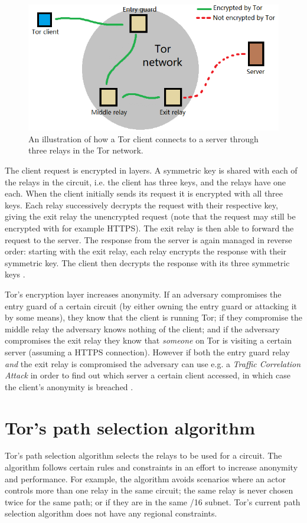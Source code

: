\documentclass{kththesis}
\begin{document}
\begin{figure}[!htb]
    \centering
    \includegraphics[width=350pt]{resources/paint_tor_circuit.png}
    \caption{An illustration of how a Tor client connects to a server through three relays in the Tor network.}
    \label{fig:torCircuit}
\end{figure}

The client request is encrypted in layers. A symmetric key is shared with each of the relays in the circuit, i.e. the client has three keys, and the relays have one each. When the client initially sends its request it is encrypted with all three keys. Each relay successively decrypts the request with their respective key, giving the exit relay the unencrypted request (note that the request may still be encrypted with for example HTTPS). The exit relay is then able to forward the request to the server. The response from the server is again managed in reverse order: starting with the exit relay, each relay encrypts the response with their symmetric key. The client then decrypts the response with its three symmetric keys \parencite{TorOnionRouter}\parencite{UnderstandingTor}.

Tor's encryption layer increases anonymity. If an adversary compromises the entry guard of a certain circuit (by either owning the entry guard or attacking it by some means), they know that the client is running Tor; if they compromise the middle relay the adversary knows nothing of the client; and if the adversary compromises the exit relay they know that \emph{someone} on Tor is visiting a certain server (assuming a HTTPS connection). However if both the entry guard relay \emph{and} the exit relay is compromised the adversary can use e.g. a \emph{Traffic Correlation Attack} \parencite{CLAPS} in order to find out which server a certain client accessed, in which case the client's anonymity is breached \parencite{TorOnionRouter}.

\section{Tor's path selection algorithm}
Tor's path selection algorithm \parencite{TorPathSpecification} selects the relays to be used for a circuit. The algorithm follows certain rules and constraints in an effort to increase anonymity and performance. For example, the algorithm avoids scenarios where an actor controls more than one relay in the same circuit; the same relay is never chosen twice for the same path; or if they are in the same /16 subnet. Tor's current path selection algorithm does not have any regional constraints.
\end{document}
